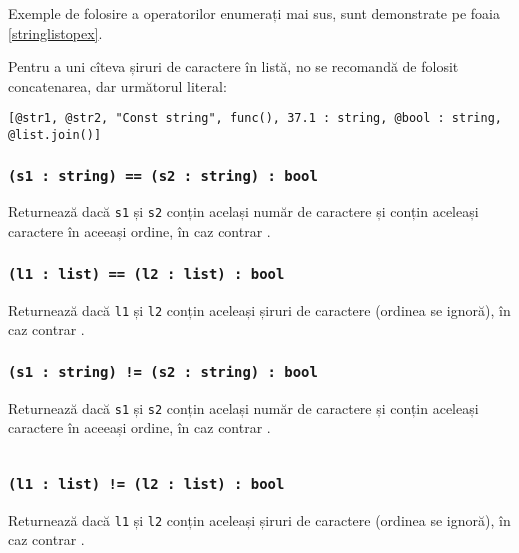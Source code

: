 Exemple de folosire a operatorilor enumerați mai sus, sunt demonstrate pe foaia \ref{stringlistopex}.

Pentru a uni cîteva șiruri de caractere în listă, no se recomandă de folosit concatenarea, dar următorul literal:
\begin{verbatim}
[@str1, @str2, "Const string", func(), 37.1 : string, @bool : string, @list.join()]
\end{verbatim}

\subsubsection{\texttt{(s1 : string) == (s2 : string) : bool}}

Returnează \true{} dacă \texttt{s1} și \texttt{s2} conțin același număr de caractere și conțin aceleași caractere în aceeași ordine, în caz contrar \false{}.

\subsubsection{\texttt{(l1 : list) == (l2 : list) : bool}}

Returnează \true{} dacă \texttt{l1} și \texttt{l2} conțin aceleași șiruri de caractere (ordinea se ignoră), în caz contrar \false{}.

\subsubsection{\texttt{(s1 : string) != (s2 : string) : bool}}

Returnează \false{} dacă \texttt{s1} și \texttt{s2} conțin același număr de caractere și conțin aceleași caractere în aceeași ordine, în caz contrar \true{}.

\begin{sourcecode}
    \label{stringlistopex}
    \inputminted[linenos]{icl}{../sources/stringlistopex.icL}
\end{sourcecode}

\subsubsection{\texttt{(l1 : list) != (l2 : list) : bool}}

Returnează \false{} dacă \texttt{l1} și \texttt{l2} conțin aceleași șiruri de caractere (ordinea se ignoră), în caz contrar \true{}.


